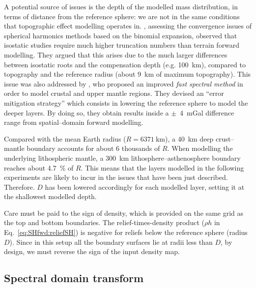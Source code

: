 A potential source of issues is the depth of the modelled mass distribution, in terms of distance from the reference sphere: we are not in the same conditions that topographic effect modelling operates in.
\Textcite{Sun2001}, assessing the convergence issues of spherical harmonics methods based on the binomial expansion, observed that isostatic studies require much higher truncation numbers than terrain forward modelling.
They argued that this arises due to the much larger differences between isostatic roots and the compensation depth (e.g. \SI{100}{\kilo \metre}), compared to topography and the reference radius (about \SI{9}{\kilo \metre} of maximum topography).
This issue was also addressed by \textcite{Root2015}, who proposed an improved \textit{fast spectral method} \parencites{Rummel1988}{Novak2006} in order to model crustal and upper mantle regions.
They devised an ``error mitigation strategy'' which consists in lowering the reference sphere to model the deeper layers.
By doing so, they obtain results inside a $\pm$~\SI{4}{\milli Gal} difference range from spatial--domain forward modelling.

Compared with the mean Earth radius ($R = \SI{6371}{\kilo \metre}$), a \SI{40}{\kilo \metre} deep crust--mantle boundary accounts for about 6 thousands of $R$.
When modelling the underlying lithospheric mantle, a \SI{300}{\kilo \metre} lithosphere--asthenosphere boundary reaches about \SI{4.7}{\percent} of $R$.
This means that the layers modelled in the following experiments are likely to incur in the issues that have been just described.
Therefore. $D$ has been lowered accordingly for each modelled layer, setting it at the shallowest modelled depth.

Care must be paid to the sign of density, which is provided on the same grid as the top and bottom boundaries.
The relief-times-density product ($\rho h$ in Eq.~\ref{eq:SHfwd:reliefSH}) is negative for reliefs below the reference sphere (radius $D$).
Since in this setup all the boundary surfaces lie at radii less than $D$, by design, we must reverse the sign of the input density map.

\subsection{Spectral domain transform}
\label{ss:SigIs:Fwd:SHtransform}

